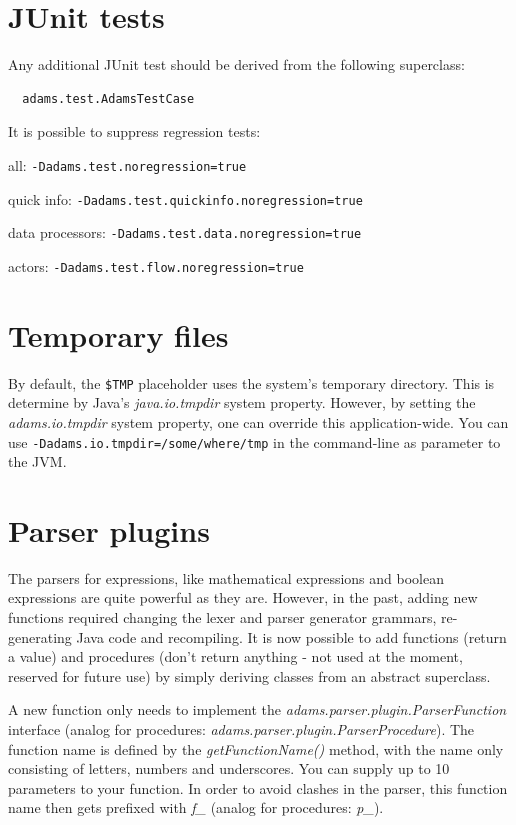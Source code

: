 \chapter{JUnit tests}
Any additional JUnit test should be derived from the following superclass:
\begin{verbatim}
  adams.test.AdamsTestCase
\end{verbatim}

It is possible to suppress regression tests:
\begin{tight_itemize}
	\item all: \texttt{-Dadams.test.noregression=true}
	\item quick info: \texttt{-Dadams.test.quickinfo.noregression=true}
	\item data processors: \texttt{-Dadams.test.data.noregression=true}
	\item actors: \texttt{-Dadams.test.flow.noregression=true}
\end{tight_itemize}

\chapter{Temporary files}
By default, the \texttt{\${TMP}} placeholder uses the system's temporary
directory. This is determine by Java's \textit{java.io.tmpdir} system property.
However, by setting the \textit{adams.io.tmpdir} system property, one can override
this application-wide. You can use \texttt{-Dadams.io.tmpdir=/some/where/tmp}
in the command-line as parameter to the JVM.


\chapter{Parser plugins}
The parsers for expressions, like mathematical expressions and boolean expressions 
are quite powerful as they are. However, in the past, adding new functions required changing 
the lexer and parser generator grammars, re-generating Java code and recompiling. 
It is now possible to add functions (return a value) and procedures (don't return 
anything - not used at the moment, reserved for future use) by simply deriving
classes from an abstract superclass.

A new function only needs to implement the \textit{adams.parser.plugin.ParserFunction}
interface (analog for procedures: \textit{adams.parser.plugin.ParserProcedure}). 
The function name is defined by the \textit{getFunctionName()} method, with the 
name only consisting of letters, numbers and underscores. You can supply up to 
10 parameters to your function. In order to avoid clashes in the parser, this 
function name then gets prefixed with \textit{f\_} (analog for procedures: \textit{p\_}).

